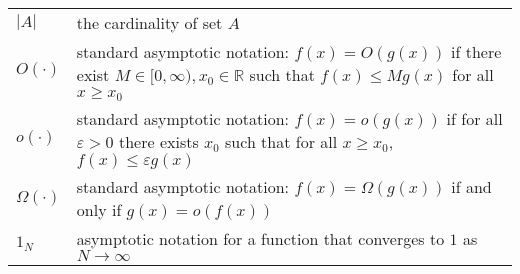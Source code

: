 \documentclass[oneside]{scrbook} %
\newcommand{\seb}[1]{\xspace\textcolor{red}{#1}\xspace} %
\theoremstyle{definition}
\newcommand{\ON}{1_N}
\newcommand{\1}[1]{\mathbbm{1}_{#1}} %
\begin{document}
\begin{longtable}{p{} p{}}
$|A|$ & the cardinality of set $A$\\
$O(\cdot)$ & standard asymptotic notation: $f(x) = O(g(x))$ if there exist $M\in[0,\infty), x_0 \in \mathbb{R}$ such that $f(x) \leq Mg(x)$ for all $x\geq x_0$ \\
$o(\cdot)$ & standard asymptotic notation: $f(x) = o(g(x))$ if for all $\varepsilon>0$ there exists $x_0$ such that for all $x\geq x_0$, $f(x) \leq \varepsilon g(x)$ \\
$\Omega(\cdot)$ & standard asymptotic notation: $f(x) = \Omega(g(x))$ if and only if $g(x) = o(f(x))$ \\
$\ON$ & asymptotic notation for a function that converges to $1$ as $N\to\infty$ \\
\end{longtable}


\mainmatter











\backmatter


\printbibliography
\end{document}
